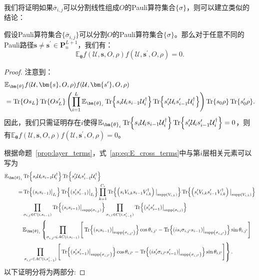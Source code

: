我们将证明如果${\overline{\sigma}_{i,j}}$可以分割线性组成$O$的Pauli算符集合$\{\sigma\}$，则可以建立类似的结论： 
\begin{lemma}\label{ap:lemma:split} 
    假设Pauli算符集合$\{\overline{\sigma}_{i,j}\}$可以分割$O$的Pauli算符集合$\{\sigma\}$。那么对于任意不同的Pauli路径$\bm{s}\neq \bm{s^{\prime}}\in \bm{P}^{L+1}_n$，我们有：
    \begin{equation} 
        \mathbb{E}_{\bm{\theta}}f(\mathcal{U},\bm{s},O,\rho)f(\mathcal{U},\bm{s^{\prime}},O,\rho)=0. 
    \end{equation}
    \begin{proof}
    注意到：
    \begin{equation}\label{ap:eq:E_cross_terms} 
        \begin{aligned} 
            &\mathbb{E}_{\bm{\theta}}f(\mathcal{U},\bm{s},O,\rho)f(\mathcal{U},\bm{s^{\prime}},O,\rho)\\
            &=\Tr{Os_L}\Tr{Os'_L}\left(\prod_{i=1}^{L}\mathbb{E}_{\bm{\theta}_i}\Tr{s_i\mathcal{U}_i s_{i-1}\mathcal{U}_i^\dagger}\Tr{s'_i\mathcal{U}_i s'_{i-1}\mathcal{U}_i^\dagger}\right)\Tr{s_0\rho}\Tr{s'_0\rho}.
        \end{aligned} 
    \end{equation} 
    因此，我们只需证明存在$i$使得$\mathbb{E}_{\bm{\theta}_i}\Tr{s_i\mathcal{U}_i s_{i-1}\mathcal{U}_i^\dagger}\Tr{s'_i\mathcal{U}_i s'_{i-1}\mathcal{U}_i^\dagger}=0$，则有$\mathbb{E}_{\bm{\theta}}f(\mathcal{U},\bm{s},O,\rho)f(\mathcal{U},\bm{s^{\prime}},O,\rho)=0$。
    
    根据命题~\ref{prop:layer_terms}，式~\eqref{ap:eq:E_cross_terms}中与第$i$层相关元素可以写为 
    \begin{equation}\label{ap:eq:E_cross_i-layer} 
        \begin{aligned} 
            \mathbb{E}_{\bm{\theta}_i}&\Tr{s_i\mathcal{U}_i s_{i-1}\mathcal{U}_i^\dagger}\Tr{s'_i\mathcal{U}_i s'_{i-1}\mathcal{U}_i^\dagger}\\
            =&\Tr{(s_i s_{i-1})\big|_{I_i}}\Tr{(s'_i s'_{i-1})\big|_{I_i}}
            \prod_{k=1}^{C_i}\Tr{\left(s_iV_{i,k} s_{i-1}V_{i,k}^{\dagger}\right)\big|_\g{V_{i,k}}}\Tr{\left(s'_iV_{i,k} s'_{i-1}V_{i,k}^{\dagger}\right)\big|_\g{V_{i,k}}}\\
            &\prod_{\sigma_{i,j}\in C(i,s_{i-1})}\Tr{(s_i s_{i-1})\big|_{\g{\sigma_{i,j}}}}\prod_{\sigma_{i,l}\in C(i,s_{i-1}')}\Tr{(s'_i s'_{i-1})\big|_{\g{\sigma_{i,l}}}}\\
            &\mathbb{E}_{\bm{\theta}_i}\left\{\prod_{\sigma_{i,j'}\in AC(i,s_{i-1})}\Bigg[ \Tr{(s_i s_{i-1})\big|_{\g{\sigma_{i,j'}}}}\cos{\theta_{i,j'}}
            - \Tr{(is_i \sigma_{i,j'}s_{i-1})\big|_{\g{\sigma_{i,j'}}}}\sin{\theta_{i,j'}}\Bigg]\right.\\
            &\left.\prod_{\sigma_{i,l'}\in AC(i,s_{i-1}')}\Bigg[ \Tr{(s'_i s'_{i-1})\big|_{\g{\sigma_{i,l'}}}}\cos{\theta_{i,l'}}
            - \Tr{(is'_i \sigma_{i,l'}s'_{i-1})\big|_{\g{\sigma_{i,l'}}}}\sin{\theta_{i,l'}}\Bigg]\right\}.
        \end{aligned} 
    \end{equation}
    以下证明分将为两部分:


\end{proof}
\end{lemma}
